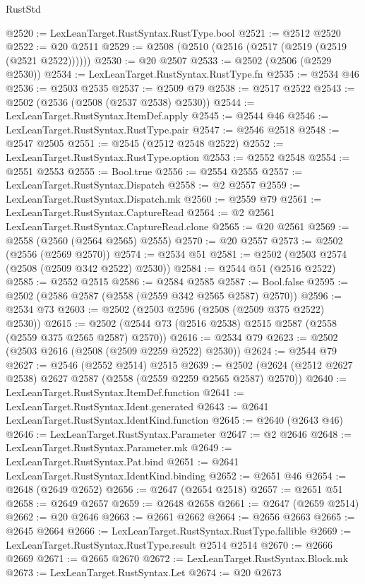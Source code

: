 \begin{lexlean}{RustStd}
\begin{coremodule}
{\begin{coremodule}
{{{{{{{{{{{{{{{{{{{{{{{{{{@2520 := LexLeanTarget.RustSyntax.RustType.bool
@2521 := @2512 @2520
@2522 := @20 @2511
@2529 := @2508 (@2510 (@2516 (@2517 (@2519 (@2519 (@2521 @2522))))))
@2530 := @20 @2507
@2533 := @2502 (@2506 (@2529 @2530))
@2534 := LexLeanTarget.RustSyntax.RustType.fn
@2535 := @2534 @46
@2536 := @2503 @2535
@2537 := @2509 @79
@2538 := @2517 @2522
@2543 := @2502 (@2536 (@2508 (@2537 @2538) @2530))
@2544 := LexLeanTarget.RustSyntax.ItemDef.apply
@2545 := @2544 @46
@2546 := LexLeanTarget.RustSyntax.RustType.pair
@2547 := @2546 @2518
@2548 := @2547 @2505
@2551 := @2545 (@2512 @2548 @2522)
@2552 := LexLeanTarget.RustSyntax.RustType.option
@2553 := @2552 @2548
@2554 := @2551 @2553
@2555 := Bool.true
@2556 := @2554 @2555
@2557 := LexLeanTarget.RustSyntax.Dispatch
@2558 := @2 @2557
@2559 := LexLeanTarget.RustSyntax.Dispatch.mk
@2560 := @2559 @79
@2561 := LexLeanTarget.RustSyntax.CaptureRead
@2564 := @2 @2561 LexLeanTarget.RustSyntax.CaptureRead.clone
@2565 := @20 @2561
@2569 := @2558 (@2560 (@2564 @2565) @2555)
@2570 := @20 @2557
@2573 := @2502 (@2556 (@2569 @2570))
@2574 := @2534 @51
@2581 := @2502 (@2503 @2574 (@2508 (@2509 @342 @2522) @2530))
@2584 := @2544 @51 (@2516 @2522)
@2585 := @2552 @2515
@2586 := @2584 @2585
@2587 := Bool.false
@2595 := @2502 (@2586 @2587 (@2558 (@2559 @342 @2565 @2587) @2570))
@2596 := @2534 @73
@2603 := @2502 (@2503 @2596 (@2508 (@2509 @375 @2522) @2530))
@2615 := @2502 (@2544 @73 (@2516 @2538) @2515 @2587 (@2558 (@2559 @375 @2565 @2587) @2570))
@2616 := @2534 @79
@2623 := @2502 (@2503 @2616 (@2508 (@2509 @2259 @2522) @2530))
@2624 := @2544 @79
@2627 := @2546 (@2552 @2514) @2515
@2639 := @2502 (@2624 (@2512 @2627 @2538) @2627 @2587 (@2558 (@2559 @2259 @2565 @2587) @2570))
@2640 := LexLeanTarget.RustSyntax.ItemDef.function
@2641 := LexLeanTarget.RustSyntax.Ident.generated
@2643 := @2641 LexLeanTarget.RustSyntax.IdentKind.function
@2645 := @2640 (@2643 @46)
@2646 := LexLeanTarget.RustSyntax.Parameter
@2647 := @2 @2646
@2648 := LexLeanTarget.RustSyntax.Parameter.mk
@2649 := LexLeanTarget.RustSyntax.Pat.bind
@2651 := @2641 LexLeanTarget.RustSyntax.IdentKind.binding
@2652 := @2651 @46
@2654 := @2648 (@2649 @2652)
@2656 := @2647 (@2654 @2518)
@2657 := @2651 @51
@2658 := @2649 @2657
@2659 := @2648 @2658
@2661 := @2647 (@2659 @2514)
@2662 := @20 @2646
@2663 := @2661 @2662
@2664 := @2656 @2663
@2665 := @2645 @2664
@2666 := LexLeanTarget.RustSyntax.RustType.fallible
@2669 := LexLeanTarget.RustSyntax.RustType.result @2514 @2514
@2670 := @2666 @2669
@2671 := @2665 @2670
@2672 := LexLeanTarget.RustSyntax.Block.mk
@2673 := LexLeanTarget.RustSyntax.Let
@2674 := @20 @2673
}}}}}}}}}}}}}}}}}}}}}}}}}}
\end{coremodule}}
\end{coremodule}
\end{lexlean}
